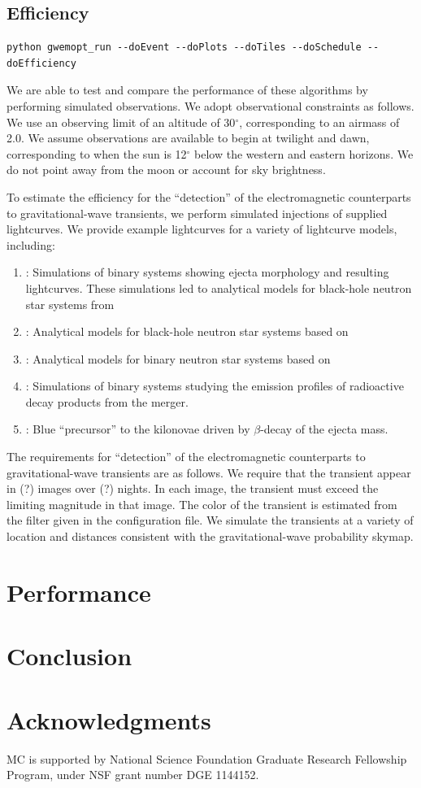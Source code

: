 \documentclass[twocolumn]{aastex61}
\newcommand{\rednote}[1]{{\color{red} (#1)}}
\begin{document}
\subsection{Efficiency}
\begin{lstlisting}
python gwemopt_run --doEvent --doPlots --doTiles --doSchedule --doEfficiency
\end{lstlisting}
We are able to test and compare the performance of these algorithms by performing simulated observations. 
We adopt observational constraints as follows. 
We use an observing limit of an altitude of 30$^\circ$, corresponding to an airmass of 2.0. 
We assume observations are available to begin at twilight and dawn, corresponding to when the sun is 12$^\circ$ below the western and eastern horizons.
We do not point away from the moon or account for sky brightness.

To estimate the efficiency for the ``detection'' of the electromagnetic counterparts to gravitational-wave transients, we perform simulated injections of supplied lightcurves. We provide example lightcurves for a variety of lightcurve models, including:

\begin{enumerate}
\item \cite{TaHo2014}: Simulations of binary systems showing ejecta morphology and resulting lightcurves.
These simulations led to analytical models for black-hole neutron star systems from \item \cite{KaKy2016}: Analytical models for black-hole neutron star systems based on \cite{TaHo2014}
\item \cite{DiUj2017}: Analytical models for binary neutron star systems based on \cite{TaHo2014}
\item \cite{BaKa2016}: Simulations of binary systems studying the emission profiles of radioactive decay products from the merger.
\item \cite{MeBa2015}: Blue ``precursor'' to the kilonovae driven by $\beta$-decay of the ejecta mass.
\end{enumerate}

The requirements for ``detection'' of the electromagnetic counterparts to gravitational-wave transients are as follows.
We require that the transient appear in \rednote{?} images over \rednote{?} nights.
In each image, the transient must exceed the limiting magnitude in that image.
The color of the transient is estimated from the filter given in the configuration file.
We simulate the transients at a variety of location and distances consistent with the gravitational-wave probability skymap.


\section{Performance}
\label{sec:performance}

\section{Conclusion}
\label{sec:conclusions}

\section{Acknowledgments}
MC is supported by National Science Foundation Graduate Research Fellowship Program, under NSF grant number DGE 1144152.



\end{document}
